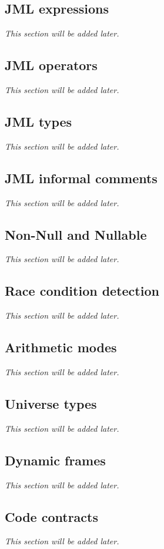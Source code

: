 \documentclass{report}%
\begin{document}
\subsection{JML expressions}
\textit{This section will be added later.} %

\subsection{JML operators}
\textit{This section will be added later.} %

\subsection{JML types}
\textit{This section will be added later.} %

\subsection{JML informal comments}
\textit{This section will be added later.} %

\subsection{Non-Null and Nullable}
\textit{This section will be added later.} %

\subsection{Race condition detection}
\textit{This section will be added later.} %

\subsection{Arithmetic modes}
\textit{This section will be added later.} %

\subsection{Universe types}
\textit{This section will be added later.} %

\subsection{Dynamic frames}
\textit{This section will be added later.} %

\subsection{Code contracts}
\textit{This section will be added later.} %
\end{document}

